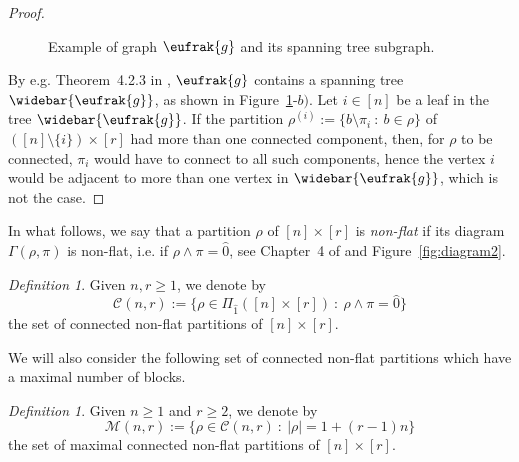 \documentclass[bj,authoryear,noshowframe]{imsart}
\theoremstyle{plain}
\theoremstyle{remark}
\newtheorem{definition}[theorem]{Definition}
\begin{document}
\begin{proof}
\begin{figure}[H]
{{%
}
}
\caption{Example of graph $\eufrak{g}$ and its spanning tree subgraph.}
\label{fig:diagram0-11}
\end{figure}

\vspace{-.4cm}
  
\noindent
By e.g. Theorem~4.2.3 in \cite{balakrishnan},
 $\eufrak{g}$ contains a spanning
 tree $\widebar{\eufrak{g}}$, 
 as shown in Figure~\ref{fig:diagram0-11}-$b)$. 
 Let $i\in [n]$ be a leaf in the tree $\widebar{\eufrak{g}}$. 
 If the partition 
 ${\rho}^{(i)}:=\{ b \setminus \pi_i \ \!  : \ \!  b\in \rho \}$
 of $([n] \setminus \{i\} ) \times [r]$ 
 had more than one connected component, then, for $\rho$ to be connected,
 $\pi_i$ would have to connect to all such components, 
 hence the vertex $i$ would be adjacent to
 more than one vertex in $\widebar{\eufrak{g}}$,
 which is not the case.
\end{proof}
 In what follows, we say that a partition $\rho$ of $[n]\times [r]$ 
 is {\em non-flat} if 
 its diagram $\Gamma(\rho,\pi )$ is non-flat, i.e. 
 if $\rho \wedge \pi = \widehat{0}$,
 see Chapter~4 of \cite{peccatitaqqu} and Figure~\ref{fig:diagram2}. 

\begin{definition} 
  \noindent
 Given $n,r\geq 1$, we denote by 
 $$
 \mathcal{C} (n,r) :=\{\rho\in\Pi_{\widehat{1}} ([n]\times[r]) \ : \ \rho\wedge \pi=\widehat{0} \}
  $$
 the set of connected non-flat partitions of $[n]\times[r]$. 
\end{definition}
\noindent 
We will also consider the following set of 
 connected non-flat partitions which have a maximal
 number of blocks. 
 \begin{definition} 
  \noindent
 Given $n\geq 1$ and $r\geq 2$,
we denote by
$$
 \mathcal{M}(n,r):=\{\rho\in \mathcal{C} (n,r)  \ : \ |\rho|= 1 + (r-1)n \}
  $$
 the set of maximal connected non-flat partitions of $[n]\times[r]$.
\end{definition}
\end{document}
